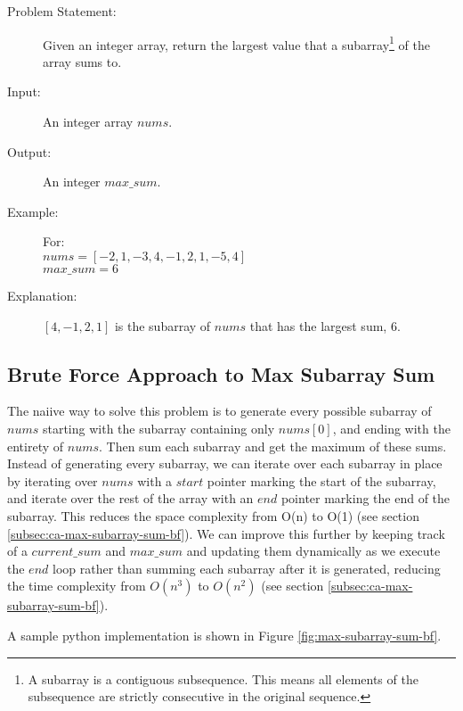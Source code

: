 \begin{description}
    \item[Problem Statement:]
        Given an integer array, return the largest value that a subarray\footnote{A subarray is a contiguous subsequence. This means all elements of the subsequence are strictly consecutive in the original sequence.} of the array sums to.

    \item[Input:]
        An integer array $nums$.
        
    \item[Output:]
        An integer $max\_sum$. 
        
    \item[Example:] For:\\
        $nums =  [-2,1,-3,4,-1,2,1,-5,4]$\\
        $max\_sum = 6$
        
    \item[Explanation:]
        $[4,-1,2,1]$ is the subarray of $nums$ that has the largest sum, 6.
        
\end{description}


\subsection{Brute Force Approach to Max Subarray Sum}
The naiive way to solve this problem is to generate every possible subarray of $nums$
starting with the subarray containing only $nums[0]$, and ending with the entirety of $nums$.
Then sum each subarray and get the maximum of these sums.
Instead of generating every subarray, we can iterate over each subarray in place by iterating over $nums$ with a $start$ pointer marking the start of the subarray,
and iterate over the rest of the array with an $end$ pointer marking the end of the subarray. This reduces the space complexity from O(n) to O(1) (see section \ref{subsec:ca-max-subarray-sum-bf}).
We can improve this further by keeping track of a $current\_sum$ and $max\_sum$ and updating them dynamically as we execute the $end$ loop rather than summing each subarray after it is generated,
reducing the time complexity from $O(n^3)$ to $O(n^2)$ (see section \ref{subsec:ca-max-subarray-sum-bf}).

A sample python implementation is shown in Figure \ref{fig:max-subarray-sum-bf}.


